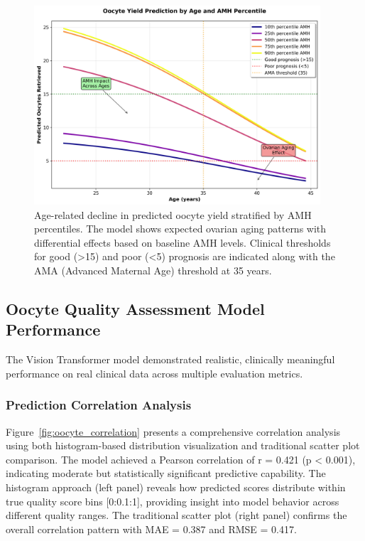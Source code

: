 \begin{figure}[H]
    \centering
    \includegraphics[width=0.95\textwidth]{figures/calculator_age_oocytes.png}
    \caption{Age-related decline in predicted oocyte yield stratified by AMH percentiles. The model shows expected ovarian aging patterns with differential effects based on baseline AMH levels. Clinical thresholds for good (>15) and poor (<5) prognosis are indicated along with the AMA (Advanced Maternal Age) threshold at 35 years.}
    \label{fig:calculator_age}
\end{figure}

\subsection{Oocyte Quality Assessment Model Performance}

The Vision Transformer model demonstrated realistic, clinically meaningful performance on real clinical data across multiple evaluation metrics.

\subsubsection{Prediction Correlation Analysis}

Figure~\ref{fig:oocyte_correlation} presents a comprehensive correlation analysis using both histogram-based distribution visualization and traditional scatter plot comparison. The model achieved a Pearson correlation of r = 0.421 (p < 0.001), indicating moderate but statistically significant predictive capability. The histogram approach (left panel) reveals how predicted scores distribute within true quality score bins [0:0.1:1], providing insight into model behavior across different quality ranges. The traditional scatter plot (right panel) confirms the overall correlation pattern with MAE = 0.387 and RMSE = 0.417.

